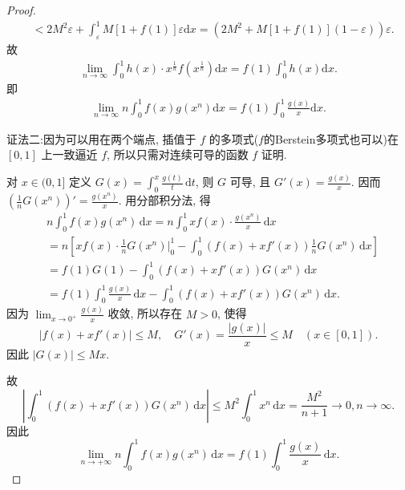 \documentclass[../../main.tex]{subfiles}
\begin{document}
\begin{proof}
\begin{align*}
&<2M^2\varepsilon+\int_{\varepsilon}^1 M\left[1+f(1)\right]\varepsilon\mathrm{d}x=\left(2M^2+M\left[1+f(1)\right]\left(1-\varepsilon\right)\right)\varepsilon.
\end{align*}
故
\begin{align*}
\lim\limits_{n\rightarrow \infty}\int_0^1 h(x)\cdot x^{\frac{1}{n}}f\left(x^{\frac{1}{n}}\right)\mathrm{d}x=f(1)\int_0^1 h(x)\mathrm{d}x.
\end{align*}
即
\begin{align*}
\lim_{n\rightarrow \infty}n\int_0^1 f(x)g(x^n)\mathrm{d}x=f(1)\int_0^1 \frac{g(x)}{x}\mathrm{d}x.
\end{align*}

{\color{blue}证法二:}因为可以用在两个端点, 插值于 \( f \) 的多项式($f$的Berstein多项式也可以)在 \([0,1]\) 上一致逼近 \( f \), 所以只需对连续可导的函数 \( f \) 证明.

对 \( x \in (0,1] \) 定义 \( G(x) = \int_{0}^{x} \frac{g(t)}{t} \, \mathrm{d}t \), 则 \( G \) 可导, 且 \( G'(x) = \frac{g(x)}{x} \). 因而 \( \left( \frac{1}{n} G(x^n) \right)' = \frac{g(x^n)}{x} \). 用分部积分法, 得
\[
\begin{aligned}
&n \int_{0}^{1} f(x) g(x^n) \, \mathrm{d}x = n \int_{0}^{1} x f(x) \cdot \frac{g(x^n)}{x} \, \mathrm{d}x \\
&= n \left[ x f(x) \cdot \frac{1}{n} G(x^n) \bigg|_{0}^{1} - \int_{0}^{1} \left( f(x) + x f'(x) \right) \frac{1}{n} G(x^n) \, \mathrm{d}x \right] \\
&= f(1) G(1) - \int_{0}^{1} \left( f(x) + x f'(x) \right) G(x^n) \, \mathrm{d}x \\
&= f(1) \int_{0}^{1} \frac{g(x)}{x} \, \mathrm{d}x - \int_{0}^{1} \left( f(x) + x f'(x) \right) G(x^n) \, \mathrm{d}x.
\end{aligned}
\]
因为 \( \lim_{x \to 0^+} \frac{g(x)}{x} \) 收敛, 所以存在 \( M > 0 \), 使得
\[
|f(x) + x f'(x)| \leqslant M, \quad G'(x)=\frac{|g(x)|}{x} \leqslant M \quad (x \in [0,1]).
\]
因此 \( |G(x)| \leqslant M x \).

故
\[
\left| \int_{0}^{1} \left( f(x) + x f'(x) \right) G(x^n) \, \mathrm{d}x \right| \leqslant M^2 \int_{0}^{1} x^n \, \mathrm{d}x = \frac{M^2}{n + 1}\to 0,n\to \infty.
\]
因此
\[
\lim_{n \to +\infty} n \int_{0}^{1} f(x) g(x^n) \, \mathrm{d}x = f(1) \int_{0}^{1} \frac{g(x)}{x} \, \mathrm{d}x.
\]

\end{proof}
\end{document}
